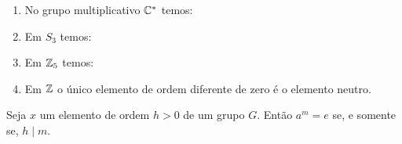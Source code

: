 \documentclass{beamer}
\begin{document}
    \begin{frame}
        \begin{exemplos}
            \begin{enumerate}[label={\arabic*})]
                \item No grupo multiplicativo $\mathbb{C}^*$ temos:

                \item Em $S_3$ temos:

                \item Em $\mathbb{Z}_5$ temos:

                \item Em $\mathbb{Z}$ o único elemento de ordem diferente de zero é o elemento neutro.
            \end{enumerate}
        \end{exemplos}
    \end{frame}

    \begin{frame}
        \begin{proposicao}
            Seja $x$ um elemento de ordem $h > 0$ de um grupo $G$. Então $a^m = e$ se, e somente se, $h \mid m$.
        \end{proposicao}
    \end{frame}
\end{document}
